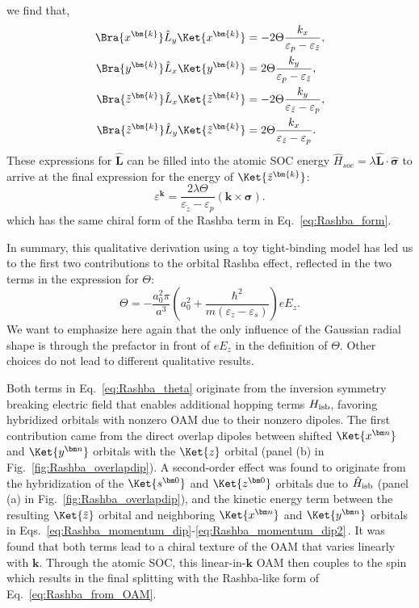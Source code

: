 we find that,
\begin{align}
	\label{eq:oam_from_k}
	\Bra{x^{\bm{k}}} \hat{L}_y \Ket{x^{\bm{k}}} &= -2 \Theta \frac{k_x}{\varepsilon_p - \varepsilon_{\tilde{z}}},\\
	\Bra{y^{\bm{k}}} \hat{L}_x \Ket{y^{\bm{k}}} &= 2 \Theta \frac{k_y}{\varepsilon_p - \varepsilon_{\tilde{z}}},\\
	\Bra{\tilde{z}^{\bm{k}}} \hat{L}_x \Ket{\tilde{z}^{\bm{k}}} &= - 2 \Theta \frac{k_y}{\varepsilon_{\tilde{z}} - \varepsilon_p},\\ 
	\Bra{\tilde{z}^{\bm{k}}} \hat{L}_y \Ket{\tilde{z}^{\bm{k}}} &= 2 \Theta \frac{k_x}{\varepsilon_{\tilde{z}}-\varepsilon_p}\label{eq:oam_from_k_final}.
\end{align}
These expressions for $\hat{\bm{L}}$ can be filled into the atomic \gls{SOC} energy $\hat{H}_{soc}= \lambda \hat{\bm{L}} \cdot \hat{\bm{\sigma}}$ to arrive at the final expression for the energy of $\Ket{\tilde{z}^{\bm{k}}}$:
\begin{equation}
	\label{eq:Rashba_from_OAM}
	\varepsilon^{\bm{k}} = \frac{2 \lambda \Theta}{\varepsilon_{\tilde{z}}-\varepsilon_p}(\bm{k} \times \bm{\sigma}).
\end{equation}
which has the same chiral form of the Rashba term in Eq.~\eqref{eq:Rashba_form}.
    
In summary, this qualitative derivation using a toy tight-binding model has led us to the first two contributions to the orbital Rashba effect, reflected in the two terms in the expression for $\Theta$:
\begin{equation}
	\label{eq:Rashba_theta}
\Theta = -\frac{a_0^2 \pi}{a^3}\left(a_0^2 + \frac{\hbar^2}{m(\varepsilon_z - \varepsilon_s)}\right) e E_z.
\end{equation}
We want to emphasize here again that the only influence of the Gaussian radial shape is through the prefactor in front of $e E_z$ in the definition of $\Theta$.
Other choices do not lead to different qualitative results.

Both terms in Eq.~\eqref{eq:Rashba_theta} originate from the inversion symmetry breaking electric field that enables additional hopping terms $H_{\rm isb}$, favoring hybridized orbitals with nonzero \gls{OAM} due to their nonzero dipoles. 
The first contribution came from the direct overlap dipoles between shifted $\Ket{x^{\bm n}}$ and $\Ket{y^{\bm n}}$ orbitals with the $\Ket{z}$ orbital (panel (b) in Fig.~\ref{fig:Rashba_overlapdip})\cite{Petersen2000}.
A second-order effect was found to originate from the hybridization of the $\Ket{s^{\bm 0}}$ and $\Ket{z^{\bm 0}}$ orbitals due to $\hat H_{\rm isb}$ (panel (a) in Fig.~\ref{fig:Rashba_overlapdip}), and the kinetic energy term between the resulting $\Ket{\tilde z}$ orbital and neighboring $\Ket{x^{\bm n}}$ and $\Ket{y^{\bm n}}$ orbitals in Eqs.~\eqref{eq:Rashba_momentum_dip}-\eqref{eq:Rashba_momentum_dip2}\,\cite{Go2016}.
It was found that both terms lead to a chiral texture of the \gls{OAM} that varies linearly with $\bm k$.
Through the atomic \gls{SOC}, this linear-in-$\bm k$ \gls{OAM} then couples to the spin which results in the final splitting with the Rashba-like form of Eq.~\eqref{eq:Rashba_from_OAM}.
    
